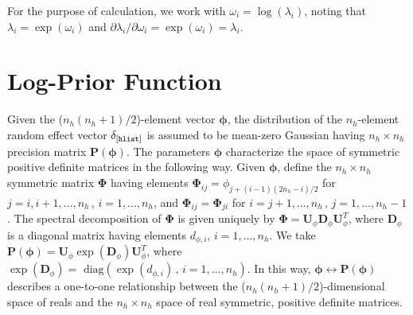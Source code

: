 \documentclass[11pt, oneside]{article}   	%
\begin{document}
For the purpose of calculation, we work with $\omega_i = \log(\lambda_i)$, noting that $\lambda_i = \exp(\omega_i)$ and $\partial \lambda_i /\partial \omega_i = \exp(\omega_i) = \lambda_i$.

\section{Log-Prior Function}

\noindent
Given the ($n_h (n_h+1)/2$)-element vector $\mathbf{\phi}$, the distribution of the $n_h$-element random effect vector $\delta_{[\mbox{{\scriptsize {\tt hlist}}}]}$ is assumed to be mean-zero Gaussian having $n_h \times n_h$ precision matrix $\mathbf{P} (\mathbf{\phi})$.  The parameters $\mathbf{\phi}$ characterize the space of symmetric positive definite matrices in the following way.  Given $\mathbf{\phi}$, define the $n_h \times n_h$ symmetric matrix $\mathbf{\Phi}$ having elements $\mathbf{\Phi}_{ij} = \phi_{j+(i-1)(2n_h-i)/2}$ for $j = i, i+1, \ldots, n_h \,,\, i = 1, \ldots, n_h$, and $\mathbf{\Phi}_{ij} = \mathbf{\Phi}_{ji}$ for $i = j+1, \ldots, n_h \,,\, j = 1, \ldots, n_h-1$.  The spectral decomposition of $\mathbf{\Phi}$ is given uniquely by $\mathbf{\Phi} = \mathbf{U}_\phi \mathbf{D}_\phi \mathbf{U}_\phi^T$, where $\mathbf{D}_\phi$ is a diagonal matrix having elements $d_{\phi,i}$, $i = 1, \ldots, n_h$.  We take $\mathbf{P}(\mathbf{\phi}) = \mathbf{U}_\phi \exp \left( \mathbf{D}_\phi \right) \mathbf{U}_{\phi}^T$, where $\exp \left( \mathbf{D}_\phi \right) = \mbox{ diag} \left( \exp \left( d_{\phi,i} \right) \,,\, i=1,\ldots, n_h \right)$.  In this way, $\mathbf{\phi} \leftrightarrow \mathbf{P}(\mathbf{\phi})$ describes a one-to-one relationship between the ($n_h (n_h+1)/2$)-dimensional space of reals and the $n_h \times n_h$ space of real symmetric, positive definite matrices.

\vspace{5mm}
\end{document}
